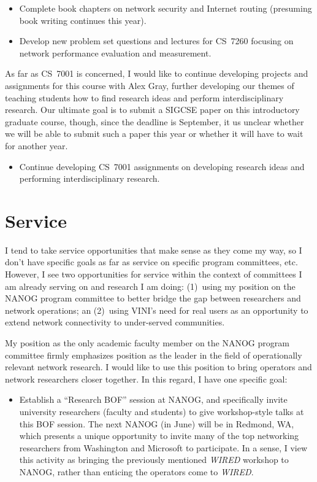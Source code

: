 \begin{sloppypar}
\begin{itemize}
\itemsep=-1pt
\item Complete book chapters on network security and Internet routing
  (presuming book writing continues this year).
\item Develop new problem set questions and lectures for CS~7260
  focusing on network performance evaluation and measurement.
\end{itemize}

As far as CS~7001 is concerned, I would like to continue developing
projects and assignments for this course with Alex Gray, further
developing our themes of teaching students how to find research ideas
and perform interdisciplinary research.  Our ultimate goal is to submit
a SIGCSE paper on this introductory graduate course, though, since
the deadline is September, it us unclear whether we will be able to
submit such a paper this year or whether it will have to wait for
another year. 

\begin{itemize}
\itemsep=-1pt
\item Continue developing CS~7001 assignments on developing research
  ideas and performing interdisciplinary research.
\end{itemize}

\section*{Service}

I tend to take service opportunities that make sense as they come my
way, so I don't have specific goals as far as service on specific
program committees, etc.  However, I see two opportunities for service
within the context of committees I am already serving on and research I
am doing: (1)~using my position on the NANOG program committee to better
bridge the gap between researchers and network operations; an (2)~using
VINI's need for real users as an opportunity to extend network
connectivity to under-served communities.  

My position as the only academic faculty member on the NANOG program
committee firmly emphasizes position as the leader in the field of
operationally relevant network research.  I would like to use this
position to bring operators and network researchers closer together.  In
this regard, I have one specific goal:
\begin{itemize}
\item Establish a ``Research BOF'' session at NANOG, and specifically
  invite university researchers (faculty and students) to give
  workshop-style talks at this BOF session.  The next NANOG (in June)
  will be in Redmond, WA, which presents a unique opportunity to invite
  many of the top networking researchers from Washington and Microsoft
  to participate.  In a sense, I view this activity as bringing the
  previously mentioned {\em WIRED} workshop to NANOG, rather than
  enticing the operators come to {\em WIRED}.
\end{itemize}


\end{sloppypar}
